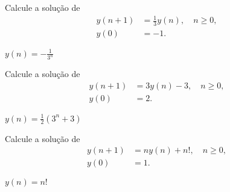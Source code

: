 \begin{exer}
  Calcule a solução de
  \begin{align}
    y(n+1) &= \frac{1}{3}y(n),\quad n\geq 0,\\
    y(0) &= -1.
  \end{align}
\end{exer}
\begin{resp}
  $y(n) = -\frac{1}{3^n}$
\end{resp}

\begin{exer}
  Calcule a solução de
  \begin{align}
    y(n+1) &= 3y(n) -3,\quad n\geq 0,\\
    y(0) &= 2.
  \end{align}
\end{exer}
\begin{resp}
  $y(n) = \frac{1}{2}(3^n+3)$
\end{resp}

\begin{exer}
  Calcule a solução de
  \begin{align}
    y(n+1) &= ny(n)+n!,\quad n\geq 0,\\
    y(0) &= 1.
  \end{align}
\end{exer}
\begin{resp}
  $y(n)=n!$
\end{resp}

\emconstrucao